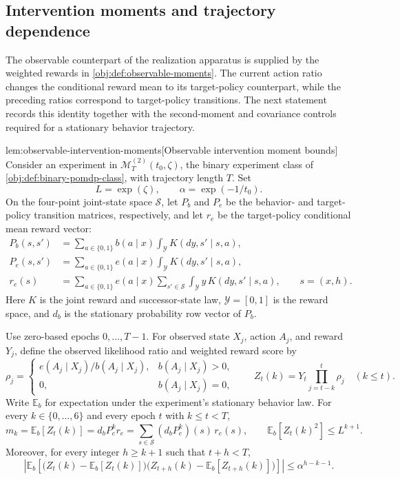 \documentclass[11pt]{article}
\begin{document}
\subsection{Intervention moments and trajectory dependence}

The observable counterpart of the realization apparatus is supplied by the weighted rewards in \cref{obj:def:observable-moments}. The current action ratio changes the conditional reward mean to its target-policy counterpart, while the preceding ratios correspond to target-policy transitions. The next statement records this identity together with the second-moment and covariance controls required for a stationary behavior trajectory.

\begin{lemmav}{lem:observable-intervention-moments}[Observable intervention moment bounds]
Consider an experiment in \(\mathcal M_T^{(2)}(t_0,\zeta)\), the binary experiment class of \cref{obj:def:binary-pomdp-class}, with trajectory length \(T\). Set
\[
L=\exp(\zeta),\qquad \alpha=\exp(-1/t_0).
\]
On the four-point joint-state space \(\mathcal S\), let \(P_b\) and \(P_e\) be the behavior- and target-policy transition matrices, respectively, and let \(r_e\) be the target-policy conditional mean reward vector:
\[
\begin{aligned}
P_b(s,s')&=\sum_{a\in\{0,1\}}b(a\mid x)
                  \int_{\mathcal Y}K(dy,s'\mid s,a),\\
P_e(s,s')&=\sum_{a\in\{0,1\}}e(a\mid x)
                  \int_{\mathcal Y}K(dy,s'\mid s,a),\\
r_e(s)&=\sum_{a\in\{0,1\}}e(a\mid x)
                  \sum_{s'\in\mathcal S}\int_{\mathcal Y}y\,K(dy,s'\mid s,a),
\qquad s=(x,h).
\end{aligned}
\]
Here \(K\) is the joint reward and successor-state law, \(\mathcal Y=[0,1]\) is the reward space, and \(d_b\) is the stationary probability row vector of \(P_b\).

Use zero-based epochs \(0,\ldots,T-1\). For observed state \(X_j\), action \(A_j\), and reward \(Y_j\), define the observed likelihood ratio and weighted reward score by
\[
\rho_j=
\begin{cases}
e(A_j\mid X_j)/b(A_j\mid X_j),& b(A_j\mid X_j)>0,\\
0,& b(A_j\mid X_j)=0,
\end{cases}
\qquad
Z_t(k)=Y_t\prod_{j=t-k}^{t}\rho_j
\quad (k\le t).
\]
Write \(\mathbb E_b\) for expectation under the experiment's stationary behavior law. For every \(k\in\{0,\ldots,6\}\) and every epoch \(t\) with \(k\le t<T\),
\[
m_k=\mathbb E_b[Z_t(k)]
    =d_bP_e^kr_e
    =\sum_{s\in\mathcal S}(d_bP_e^k)(s)\,r_e(s),
\qquad
\mathbb E_b[Z_t(k)^2]\le L^{k+1}.
\]
Moreover, for every integer \(h\ge k+1\) such that \(t+h<T\),
\[
\left|
\mathbb E_b\!\left[
\bigl(Z_t(k)-\mathbb E_b[Z_t(k)]\bigr)
\bigl(Z_{t+h}(k)-\mathbb E_b[Z_{t+h}(k)]\bigr)
\right]
\right|
\le \alpha^{h-k-1}.
\]
\end{lemmav}
\end{document}
